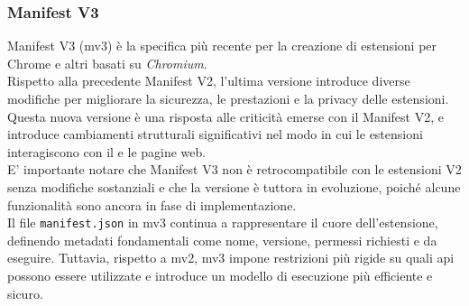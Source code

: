 \subsubsection{Manifest V3}
\label{subsec:mv3}
\noindent Manifest V3 (\acrshort{mv3}) è la specifica più recente per la creazione di estensioni per Chrome e altri  basati su \textit{Chromium}. \\Rispetto alla precedente Manifest V2, l'ultima versione introduce diverse modifiche per migliorare la sicurezza, le prestazioni e la privacy delle estensioni. \cite{site:mv3-chrome} \\
Questa nuova versione è una risposta alle criticità emerse con il Manifest V2, e introduce cambiamenti strutturali significativi nel modo in cui le estensioni interagiscono con il  e le pagine web.\\
E' importante notare che Manifest V3 non è retrocompatibile con le estensioni V2 senza modifiche sostanziali e che la versione è tuttora in evoluzione, poiché alcune funzionalità sono ancora in fase di implementazione.\\
Il file \texttt{manifest.json} in \acrshort{mv3} continua a rappresentare il cuore dell’estensione, definendo metadati fondamentali come nome, versione, permessi richiesti e  da eseguire. Tuttavia, rispetto a \acrshort{mv2}, \acrshort{mv3} impone restrizioni più rigide su quali \acrshort{api} possono essere utilizzate e introduce un modello di esecuzione più efficiente e sicuro.\\

